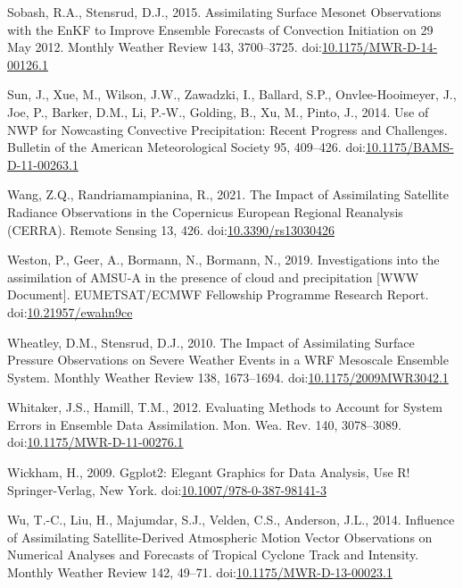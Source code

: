 \documentclass[final,5p,times,twocolumn,authoryear]{elsarticle} %
\begin{document}
\leavevmode\hypertarget{ref-sobash2015}{}%
Sobash, R.A., Stensrud, D.J., 2015. Assimilating Surface Mesonet Observations with the EnKF to Improve Ensemble Forecasts of Convection Initiation on 29 May 2012. Monthly Weather Review 143, 3700--3725. doi:\href{https://doi.org/10.1175/MWR-D-14-00126.1}{10.1175/MWR-D-14-00126.1}

\leavevmode\hypertarget{ref-sun2014}{}%
Sun, J., Xue, M., Wilson, J.W., Zawadzki, I., Ballard, S.P., Onvlee-Hooimeyer, J., Joe, P., Barker, D.M., Li, P.-W., Golding, B., Xu, M., Pinto, J., 2014. Use of NWP for Nowcasting Convective Precipitation: Recent Progress and Challenges. Bulletin of the American Meteorological Society 95, 409--426. doi:\href{https://doi.org/10.1175/BAMS-D-11-00263.1}{10.1175/BAMS-D-11-00263.1}

\leavevmode\hypertarget{ref-wang2021}{}%
Wang, Z.Q., Randriamampianina, R., 2021. The Impact of Assimilating Satellite Radiance Observations in the Copernicus European Regional Reanalysis (CERRA). Remote Sensing 13, 426. doi:\href{https://doi.org/10.3390/rs13030426}{10.3390/rs13030426}

\leavevmode\hypertarget{ref-weston2019}{}%
Weston, P., Geer, A., Bormann, N., Bormann, N., 2019. Investigations into the assimilation of AMSU-A in the presence of cloud and precipitation {[}WWW Document{]}. EUMETSAT/ECMWF Fellowship Programme Research Report. doi:\href{https://doi.org/10.21957/ewahn9ce}{10.21957/ewahn9ce}

\leavevmode\hypertarget{ref-wheatley2010}{}%
Wheatley, D.M., Stensrud, D.J., 2010. The Impact of Assimilating Surface Pressure Observations on Severe Weather Events in a WRF Mesoscale Ensemble System. Monthly Weather Review 138, 1673--1694. doi:\href{https://doi.org/10.1175/2009MWR3042.1}{10.1175/2009MWR3042.1}

\leavevmode\hypertarget{ref-whitaker2012}{}%
Whitaker, J.S., Hamill, T.M., 2012. Evaluating Methods to Account for System Errors in Ensemble Data Assimilation. Mon. Wea. Rev. 140, 3078--3089. doi:\href{https://doi.org/10.1175/MWR-D-11-00276.1}{10.1175/MWR-D-11-00276.1}

\leavevmode\hypertarget{ref-wickham2009}{}%
Wickham, H., 2009. Ggplot2: Elegant Graphics for Data Analysis, Use R! Springer-Verlag, New York. doi:\href{https://doi.org/10.1007/978-0-387-98141-3}{10.1007/978-0-387-98141-3}

\leavevmode\hypertarget{ref-wu2014}{}%
Wu, T.-C., Liu, H., Majumdar, S.J., Velden, C.S., Anderson, J.L., 2014. Influence of Assimilating Satellite-Derived Atmospheric Motion Vector Observations on Numerical Analyses and Forecasts of Tropical Cyclone Track and Intensity. Monthly Weather Review 142, 49--71. doi:\href{https://doi.org/10.1175/MWR-D-13-00023.1}{10.1175/MWR-D-13-00023.1}
\end{document}
